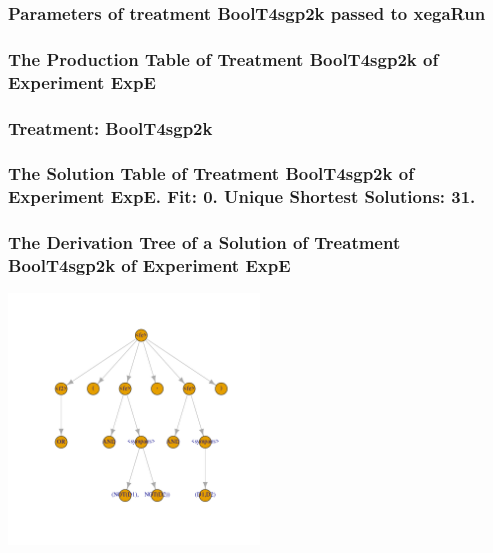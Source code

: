 \documentclass[18pt,c]{beamer}
\begin{document}
 \begin{frame}
 \fontsize{8pt}{9pt}\selectfont
 \frametitle{  Parameters of treatment BoolT4sgp2k passed to xegaRun
 }

 \label{ExpEtParmTable003.tex}  
 \end{frame}

 \begin{frame}
 \fontsize{8pt}{9pt}\selectfont
 \frametitle{ The Production Table of Treatment BoolT4sgp2k of Experiment ExpE }

 \label{ExpEGrammarTable000.tex}  
 \end{frame}

 \begin{frame}
 \fontsize{8pt}{9pt}\selectfont
 \frametitle{ Treatment: BoolT4sgp2k }

 \label{ExpEStatsTable003.tex}  
 \end{frame}

 \begin{frame}
 \fontsize{8pt}{9pt}\selectfont
 \frametitle{ The Solution Table of Treatment BoolT4sgp2k of Experiment ExpE. Fit: 0. Unique Shortest Solutions: 31. }

 \label{ExpESolutionTable000.tex}  
 \end{frame}

 \begin{frame}
 \frametitle{ The Derivation Tree of a Solution of Treatment BoolT4sgp2k of Experiment ExpE }
 \begin{center}
\includegraphics[width=0.5\textwidth, angle=0]
{ExpEDerivationTreeFigure000.pdf}
 \end{center}
 \label{report/ExpEDerivationTreeFigure000.pdf}  
 \end{frame}
\end{document}

